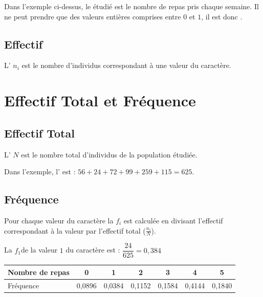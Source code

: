 \documentclass[12pt,a4paper]{article}
\begin{document}
\begin{myex}
	
	Dans l'exemple ci-dessus, le  étudié est le nombre de repas pris chaque semaine. Il ne peut prendre que des valeurs entières comprises entre $0$ et $1$, il est donc .
	
	
\end{myex}

\subsection{Effectif}

\begin{mydefs}
	L' $n_i$ est le nombre d'individus correspondant à une valeur du caractère. 
	
\end{mydefs}

\section{Effectif Total et Fréquence}

\subsection{Effectif Total}
	
	\begin{mydef}
		L' $N$ est le nombre total d'individus de la population étudiée.				
	\end{mydef}	

	\begin{myex}
		Dans l'exemple, l' est : $56 + 24 + 72 + 99 + 259 + 115 = 625$.	
	\end{myex}
			

\subsection{Fréquence}

	\begin{mydef}
		Pour chaque valeur du caractère la  $f_i$ est calculée en divisant l'effectif correspondant à la valeur par l'effectif total  ($\frac{n_i}{N}$).
	\end{mydef}
	
	\begin{myex}
		La  $f_1$de la valeur $1$ du caractère est : $\dfrac{24}{625} = 0,384$ 
		
		\begin{center}
			
			
			\begin{tabular}{|@{\ }l@{\ }|@{\ }c@{\ }|@{\ }c@{\ }|@{\ }c@{\ }|@{\ }c@{\ }|@{\ }c@{\ }|@{\ }c@{\ }|}
				\hline
				Nombre de repas & 0 & 1 & 2 & 3 & 4 & 5 \\ \hline
				Fréquence & 0,0896 & 0,0384 & 0,1152 & 0,1584 & 0,4144 & 0,1840 \\ \hline
			\end{tabular}
		\end{center}
	\end{myex}
	
\end{document}
